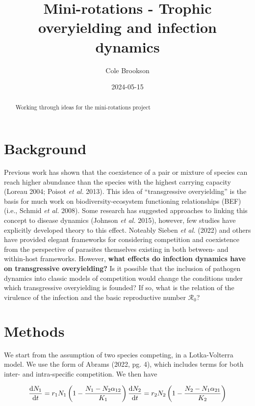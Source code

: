\documentclass[
  letterpaper,
  DIV=11,
  numbers=noendperiod]{scrartcl}
\title{Mini-rotations - Trophic overyielding and infection dynamics}
\author{Cole Brookson}
\date{2024-05-15}
\renewcommand*\contentsname{Table of contents}
\newcommand\contentsname{Table of contents}
\begin{document}
\maketitle
\begin{abstract}
Working through ideas for the mini-rotations project
\end{abstract}

\renewcommand*\contentsname{Table of contents}
{
\hypersetup{linkcolor=}
\setcounter{tocdepth}{3}
\tableofcontents
}
\section{Background}

Previous work has shown that the coexistence of a pair or mixture of
species can reach higher abundance than the species with the highest
carrying capacity (Loreau 2004; Poisot \emph{et al.} 2013). This idea of
``transgressive overyielding'' is the basis for much work on
biodiversity-ecosystem functioning relationships (BEF) (i.e., Schmid
\emph{et al.} 2008). Some research has suggested approaches to linking
this concept to disease dynamics (Johnson \emph{et al.} 2015), however,
few studies have explicitly developed theory to this effect. Noteably
Sieben \emph{et al.} (2022) and others have provided elegant frameworks
for considering competition and coexistence from the perspective of
parasites themselves existing in both between- and within-host
frameworks. However,
\textbf{what effects do infection dynamics have on transgressive overyielding?}
Is it possible that the inclusion of pathogen dynamics into classic
models of competition would change the conditions under which
transgressive overyielding is founded? If so, what is the relation of
the virulence of the infection and the basic reproductive number
\(\mathcal{R_0}\)?

\section{Methods}

We start from the assumption of two species competing, in a
Lotka-Volterra model. We use the form of Abrams (2022, pg. 4), which
includes terms for both inter- and intra-specific competition. We then
have

\begin{equation}
\label{eqn:simple-lv-1}
 \frac{\mathrm{d} N_1}{\mathrm{d}t} = r_1 N_1 \left( 1 - \frac{N_1 - N_2 \alpha_{1 2}}{K_1} \right) \\
\frac{\mathrm{d} N_2}{\mathrm{d}t} = r_2 N_2 \left( 1 - \frac{N_2 - N_1 \alpha_{2 1}}{K_2} \right) 
\end{equation}
\end{document}

